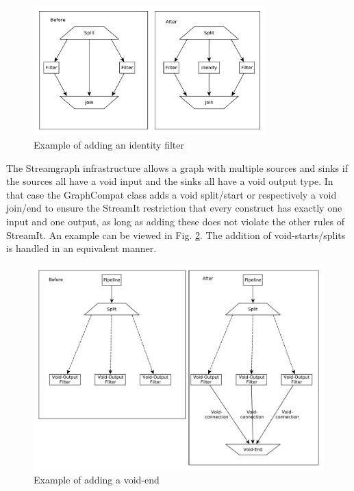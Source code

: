 \documentclass[journal]{IEEEtran}
\begin{document}
\begin{figure}[h]
	\centering
	\includegraphics[width=0.8\textwidth]{SplitJoinIdentity}
	\caption{Example of adding an identity filter}
	\label{fig_split_join_identity}
\end{figure}
\noindent The Streamgraph infrastructure allows a graph with multiple sources
and sinks if the sources all have a void input and the sinks all have a void
output type. In that case the GraphCompat class adds a void split/start or
respectively a void join/end to ensure the StreamIt restriction that every
construct has exactly one input and one output, as long as adding these does not
violate the other rules of StreamIt. An example can be viewed in Fig.
\ref{fig_void_end}. The addition of void-starts/splits is handled in an
equivalent manner.\\
\begin{figure}[h]
	\centering
	\includegraphics[width=\textwidth]{VoidEnd}
	\caption{Example of adding a void-end}
	\label{fig_void_end}
\end{figure}
\end{document}
